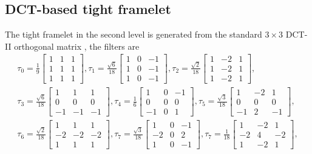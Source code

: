 \documentclass[UTF8]{article}
\begin{document}
\subsection{DCT-based tight framelet}
\par The tight framelet in the second level is generated from the standard $3 \times 3$ DCT-II orthogonal matrix , the filters are
\begin{align*}
	\tau_0=\frac{1}{9}\begin{bmatrix}
		1 & 1 & 1\\
		1 & 1 & 1\\
		1 & 1 & 1
	\end{bmatrix},
	\tau_1=\frac{\sqrt{6}}{18}\begin{bmatrix}
		1 & 0 & -1\\
		1 & 0 & -1\\
		1 & 0 & -1
	\end{bmatrix},
	\tau_2=\frac{\sqrt{2}}{18}\begin{bmatrix}
		1 & -2 & 1\\
		1 & -2 & 1\\
		1 & -2 & 1
	\end{bmatrix},\\
	\tau_3=\frac{\sqrt{6}}{18}\begin{bmatrix}
		1 & 1 & 1\\
		0 & 0 & 0\\
		-1 & -1 & -1
	\end{bmatrix},
	\tau_4=\frac{1}{6}\begin{bmatrix}
		1 & 0 & -1\\
		0 & 0 & 0\\
		-1 & 0 & 1
	\end{bmatrix},
	\tau_5=\frac{\sqrt{3}}{18}\begin{bmatrix}
		1 & -2 & 1\\
		0 & 0 & 0\\
		-1 & 2 & -1
	\end{bmatrix},  \\
	\tau_6=\frac{\sqrt{2}}{18}\begin{bmatrix}
		1 & 1 & 1\\
		-2 & -2 & -2\\
		1 & 1 & 1
	\end{bmatrix}, 
	\tau_7=\frac{\sqrt{3}}{18}\begin{bmatrix}
		1 & 0 & -1\\
		-2 & 0 & 2\\
		1 & 0 & -1
	\end{bmatrix},
	\tau_7=\frac{1}{18}\begin{bmatrix}
		1 & -2 & 1\\
		-2 & 4 & -2\\
		1 & -2 & 1
	\end{bmatrix},
\end{align*}
\end{document}

